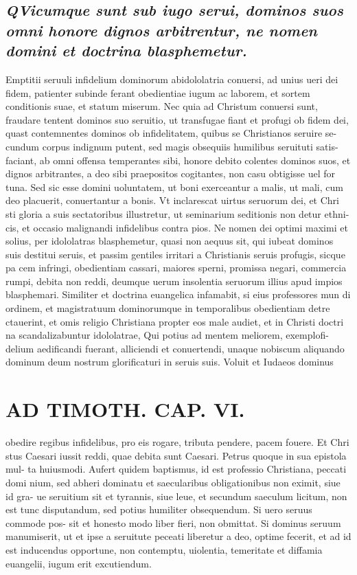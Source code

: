 \documentclass{article}
\begin{document}
\begin{pages}
\subsection*{\textit{\huge\textbf{Q}\normalsize Vicumque sunt sub iugo serui, dominos suos omni honore dignos arbitrentur, ne nomen domini et doctrina blasphemetur. }}\pstart Emptitii seruuli infidelium dominorum abidololatria conuersi, ad unius ueri dei fidem, patienter subinde ferant obedientiae iugum ac laborem, et sortem conditionis suae, et statum miserum. Nec quia ad Christum conuersi sunt, fraudare tentent dominos suo seruitio, ut transfugae fiant et profugi ob fidem dei, quast contemnentes dominos ob infidelitatem, quibus se Christianos seruire se- cundum corpus indignum putent, sed magis obsequiis humilibus seruituti satis- faciant, ab omni offensa temperantes sibi, honore debito colentes dominos suos, et dignos arbitrantes, a deo sibi praepositos cogitantes, non casu obtigisse uel for tuna. Sed sic esse domini uoluntatem, ut boni exerceantur a malis, ut mali, cum deo placuerit, conuertantur a bonis. Vt inclarescat uirtus seruorum dei, et Chri sti gloria a suis sectatoribus illustretur, ut seminarium seditionis non detur ethni- cis, et occasio malignandi infidelibus contra pios. Ne nomen dei optimi maximi et solius, per idololatras blasphemetur, quasi non aequus sit, qui iubeat dominos suis destitui seruis, et passim gentiles irritari a Christianis seruis profugis, sicque pa cem infringi, obedientiam cassari, maiores sperni, promissa negari, commercia rumpi, debita non reddi, deumque uerum insolentia seruorum illius apud impios blasphemari. Similiter et doctrina euangelica infamabit, si eius professores mun di ordinem, et magistratuum dominorumque in temporalibus obedientiam detre ctauerint, et omis religio Christiana propter eos male audiet, et in Christi doctri na scandalizabuntur idololatrae, Qui potius ad mentem meliorem, exemplofi- delium aedificandi fuerant, alliciendi et conuertendi, unaque nobiscum aliquando dominum deum nostrum glorificaturi in seruis suis. Voluit et Iudaeos dominus  \pend
\section*{AD TIMOTH. CAP. VI. }
\marginpar{[ p.529 ]}\pstart obedire regibus infidelibus, pro eis rogare, tributa pendere, pacem fouere. Et Chri stus Caesari iussit reddi, quae debita sunt Caesari. Petrus quoque in sua epistola mul- ta huiusmodi. Aufert quidem baptismus, id est professio Christiana, peccati domi nium, sed abheri dominatu et saecularibus obligationibus non eximit, siue id gra- ue seruitium sit et tyrannis, siue leue, et secundum saeculum licitum, non est tunc disputandum, sed potius humiliter obsequendum. Si uero seruus commode pos- sit et honesto modo liber fieri, non obmittat. Si dominus seruum manumiserit, ut et ipse a seruitute peceati liberetur a deo, optime fecerit, et ad id est inducendus opportune, non contemptu, uiolentia, temeritate et diffamia euangelii, iugum erit excutiendum.  \pend
{}
{}

\end{pages}
\end{document}
